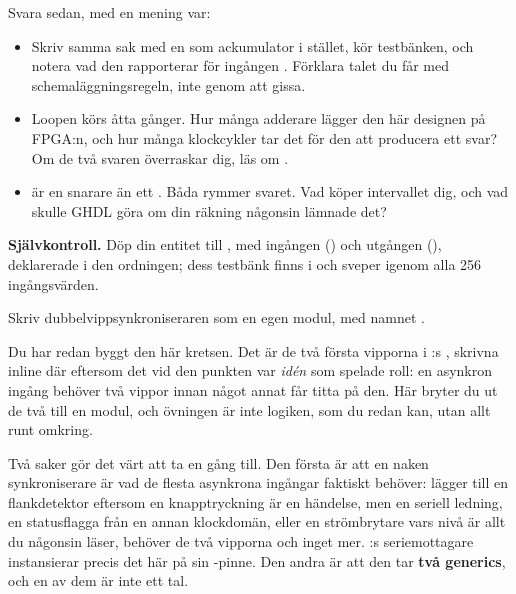 Svara sedan, med en mening var:
\begin{itemize}
  \item Skriv samma sak med en  som ackumulator i stället, kör testbänken, och notera
    vad den rapporterar för ingången . Förklara talet du får med
    schemaläggningsregeln, inte genom att gissa.
  \item Loopen körs åtta gånger. Hur många adderare lägger den här designen på FPGA:n, och hur
    många klockcykler tar det för den att producera ett svar? Om de två svaren överraskar dig, läs
    om .
  \item {} är en  snarare än ett
    . Båda rymmer svaret. Vad köper intervallet dig, och vad
    skulle GHDL göra om din räkning någonsin lämnade det?
\end{itemize}


\begin{selfcheck}
\textbf{Självkontroll.} Döp din entitet till , med ingången 
() och utgången  (),
deklarerade i den ordningen; dess testbänk finns i  och sveper igenom
alla 256 ingångsvärden.
\end{selfcheck}


\label{c5:ex:sync}
Skriv dubbelvippsynkroniseraren som en egen modul, med namnet .

Du har redan byggt den här kretsen. Det är de två första vipporna i :s
, skrivna inline där eftersom det vid den punkten var \emph{idén} som spelade
roll: en asynkron ingång behöver två vippor innan något annat får titta på den. Här bryter du ut de
två till en modul, och övningen är inte logiken, som du redan kan, utan allt runt omkring.

Två saker gör det värt att ta en gång till. Den första är att en naken synkroniserare är vad de
flesta asynkrona ingångar faktiskt behöver:  lägger till en flankdetektor
eftersom en knapptryckning är en händelse, men en seriell ledning, en statusflagga från en annan
klockdomän, eller en strömbrytare vars nivå är allt du någonsin läser, behöver de två vipporna och
inget mer. :s seriemottagare instansierar precis det här på sin -pinne. Den
andra är att den tar \textbf{två generics}, och en av dem är inte ett tal.

